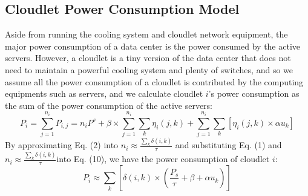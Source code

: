 \documentclass[journal,12pt,draftclsnofoot,onecolumn]{IEEEtran}
\begin{document}
	\subsection{Cloudlet Power Consumption Model}
		Aside from running the cooling system and cloudlet network equipment, the major power consumption of a data center is the power consumed by the active servers. However, a cloudlet is a tiny version of the data center that does not need to maintain a powerful cooling system and plenty of switches, and so we assume all the power consumption of a cloudlet is contributed by the computing equipments such as servers, and we calculate cloudlet $i$'s power consumption as the sum of the power consumption of the active servers:
		\begin{equation}
			{{P}_{i}}=\sum\limits_{j=1}^{{{n}_{i}}}{{{P}_{i,j}}}={{n}_{i}}{{P}^{s}}+\beta \times \sum\limits_{j=1}^{{{n}_{i}}}{\sum\limits_{k}{{{\eta }_{i}}\left( j,k \right)}+\sum\limits_{j=1}^{{{n}_{i}}}{\sum\limits_{k}{\left[ {{\eta }_{i}}\left( j,k \right)\times \alpha {{u}_{k}} \right]}}}
		\end{equation}
		By approximating Eq. (2) into ${{n}_{i}}\approx \frac{\sum\nolimits_{k}{\delta (i,k)}}{\tau }$ and substituting Eq. (1) and ${{n}_{i}}\approx \frac{\sum\nolimits_{k}{\delta (i,k)}}{\tau }$into Eq. (10), we have the power consumption of cloudlet $i$:		
		\begin{equation}
			{{P}_{i}}\approx \sum\limits_{k}{\left[ \delta \left( i,k \right)\times \left( \frac{{{P}_{s}}}{\tau }+\beta +\alpha {{u}_{k}} \right) \right]}
		\end{equation}		
\end{document}
